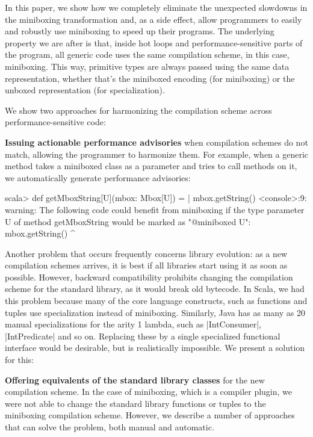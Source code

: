 In this paper, we show how we completely eliminate the unexpected slowdowns in the miniboxing transformation and, as a side effect, allow programmers to easily and robustly use miniboxing to speed up their programs. The underlying property we are after is that, inside hot loops and performance-sensitive parts of the program, all generic code uses the same compilation scheme, in this case, miniboxing. This way, primitive types are always passed using the same data representation, whether that's the miniboxed encoding (for miniboxing) or the unboxed representation (for specialization).

We show two approaches for harmonizing the compilation scheme across performance-sensitive code:

\textbf{Issuing actionable performance advisories} when compilation schemes do not match, allowing the programmer to harmonize them. For example, when a generic method takes a miniboxed class as a parameter and tries to call methods on it, we automatically generate performance advisories:

\begin{lstlisting-nobreak}
scala> def getMboxString[U](mbox: Mbox[U]) =
     |   mbox.getString()
<console>:9: warning: The following code could benefit
from miniboxing if the type parameter U of method
getMboxString would be marked as "@miniboxed U":
         mbox.getString()
               ^
\end{lstlisting-nobreak}

Another problem that occurs frequently concerns library evolution: as a new compilation schemes arrives, it is best if all libraries start using it as soon as possible. However, backward compatibility prohibits changing the compilation scheme for the standard library, as it would break old bytecode. In Scala, we had this problem because many of the core language constructs, such as functions and tuples use specialization instead of miniboxing. Similarly, Java has as many as 20 manual specializations for the arity 1 lambda, such as |IntConsumer|, |IntPredicate| and so on. Replacing these by a single specialized functional interface would be desirable, but is realistically impossible. We present a solution for this:

\textbf{Offering equivalents of the standard library classes} for the new compilation scheme. In the case of miniboxing, which is a compiler plugin, we were not able to change the standard library functions or tuples to the miniboxing compilation scheme. However, we describe a number of approaches that can solve the problem, both manual and automatic.

